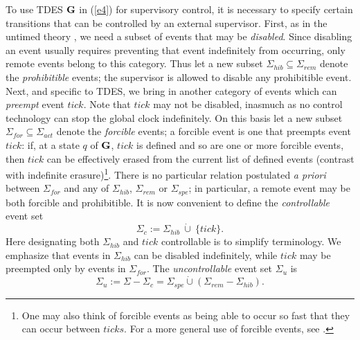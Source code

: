 \documentclass[twocolumn]{autart}
\begin{document}
To use TDES $\bf G$ in (\ref{e4}) for supervisory control, it is
necessary to specify certain transitions that can be controlled by
an external supervisor. First, as in the untimed theory
\cite{Wonham:2011a}, we need a subset of events that may be
\emph{disabled}. Since disabling an event usually requires
preventing that event indefinitely from occurring, only remote
events belong to this category. Thus let a new subset $\Sigma_{hib}
\subseteq \Sigma_{rem}$ denote the \emph{prohibitible} events; the
supervisor is allowed to disable any prohibitible event. Next, and
specific to TDES, we bring in another category of events which can
\emph{preempt} event $tick$. Note that $tick$ may not be disabled,
inasmuch as no control technology can stop the global clock
indefinitely. On this basis let a new subset $\Sigma_{for} \subseteq
\Sigma_{act}$ denote the {\it forcible} events; a forcible event is
one that preempts event $tick$: if, at a state $q$ of $\bf G$,
$tick$ is defined and so are one or more forcible events, then
$tick$ can be effectively erased from the current list of defined
events (contrast with indefinite erasure)\footnote{One may also
think of forcible events as being able to occur so fast that they
can occur between $ticks$. For a more general use of forcible
events, see \cite{GolaszewskiRamadge87}.}. There is no particular
relation postulated {\it a priori} between $\Sigma_{for}$ and any of
$\Sigma_{hib}$, $\Sigma_{rem}$ or $\Sigma_{spe}$; in particular, a
remote event may be both forcible and prohibitible. It is now
convenient to define the {\it controllable} event set
\begin{equation} \label{e8}
\Sigma_c := \Sigma_{hib}~\dot\cup~\{tick\}.
\end{equation}
Here designating both $\Sigma_{hib}$ and $tick$ controllable is to
simplify terminology. We emphasize that events in $\Sigma_{hib}$ can
be disabled indefinitely, while $tick$ may be preempted only by
events in $\Sigma_{for}$. The {\it uncontrollable} event set
$\Sigma_u$ is
\begin{equation} \label{e8}
\Sigma_{u} := \Sigma - \Sigma_c =  \Sigma_{spe} \dot\cup
(\Sigma_{rem} - \Sigma_{hib}).
\end{equation}
\end{document}
